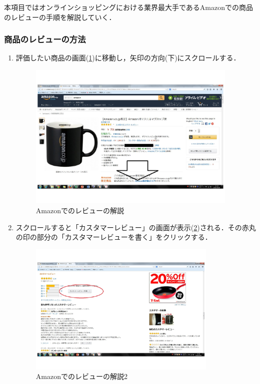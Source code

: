 本項目ではオンラインショッピングにおける業界最大手であるAmazonでの商品のレビューの手順を解説していく．

\subsubsection{商品のレビューの方法}

\begin{enumerate}

\item 評価したい商品の画面(\ref{Amazonでのレビューの解説})に移動し，矢印の方向(下)にスクロールする．

\begin{figure}[htb]
\centering
\includegraphics[width=10cm]{reviewhouhou.pdf}
\caption{Amazonでのレビューの解説}
\label{Amazonでのレビューの解説}
\end{figure}

 \item スクロールすると「カスタマーレビュー」の画面が表示(\ref{Amazonでのレビューの解説2})される．その赤丸の印の部分の「カスタマーレビューを書く」をクリックする．

\begin{figure}[htb]
\centering
\includegraphics[width=9cm]{reviewhouhou2.pdf}
\caption{Amazonでのレビューの解説2}
\label{Amazonでのレビューの解説2}
\end{figure}









\end{enumerate}
